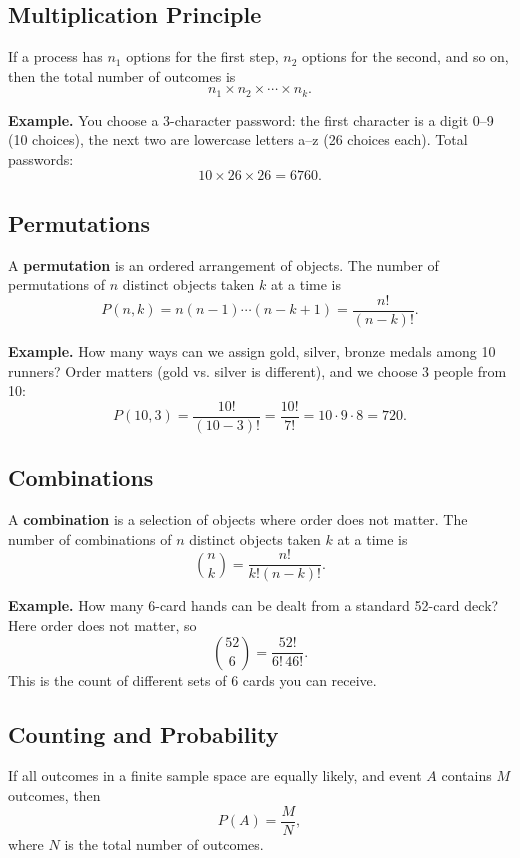 \documentclass[11pt,a4paper]{article}
\begin{document}
\subsection{Multiplication Principle}

If a process has \(n_1\) options for the first step, \(n_2\) options for the second, and so on, then the total number of outcomes is
\[
n_1 \times n_2 \times \cdots \times n_k.
\]

\textbf{Example.}  
You choose a 3-character password: the first character is a digit 0--9 (10 choices), the next two are lowercase letters a--z (26 choices each).  
Total passwords:
\[
10 \times 26 \times 26 = 6760.
\]

\subsection{Permutations}

A \textbf{permutation} is an ordered arrangement of objects.  
The number of permutations of \(n\) distinct objects taken \(k\) at a time is
\[
P(n,k) = n (n-1) \cdots (n-k+1) = \frac{n!}{(n-k)!}.
\]

\textbf{Example.}  
How many ways can we assign gold, silver, bronze medals among 10 runners?  
Order matters (gold vs. silver is different), and we choose 3 people from 10:
\[
P(10,3) = \frac{10!}{(10-3)!} = \frac{10!}{7!} = 10 \cdot 9 \cdot 8 = 720.
\]

\subsection{Combinations}

A \textbf{combination} is a selection of objects where order does not matter.  
The number of combinations of \(n\) distinct objects taken \(k\) at a time is
\[
\binom{n}{k} = \frac{n!}{k!(n-k)!}.
\]

\textbf{Example.}  
How many 6-card hands can be dealt from a standard 52-card deck?  
Here order does not matter, so
\[
\binom{52}{6} = \frac{52!}{6! \, 46!}.
\]
This is the count of different sets of 6 cards you can receive.

\subsection{Counting and Probability}

If all outcomes in a finite sample space are equally likely, and event \(A\) contains \(M\) outcomes, then
\[
P(A) = \frac{M}{N},
\]
where \(N\) is the total number of outcomes.
\end{document}
